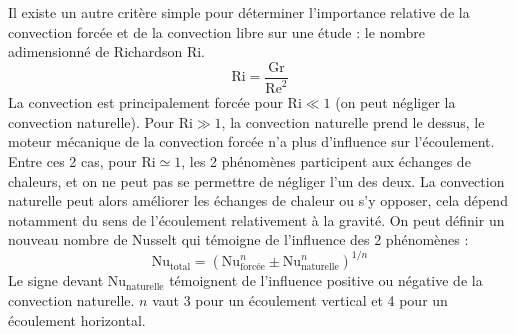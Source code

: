 Il existe un autre critère simple pour déterminer l'importance relative de la convection forcée et de la convection libre sur une étude : le nombre adimensionné de Richardson Ri.
%
\begin{equation}
    \mathrm{Ri} = \frac{\mathrm{Gr}}{\mathrm{Re}^2}
\end{equation}
%
La convection est principalement forcée pour $\mathrm{Ri} \ll 1$ (on peut négliger la convection naturelle). Pour $\mathrm{Ri} \gg 1$, la convection naturelle prend le dessus, le moteur mécanique de la convection forcée n'a plus d'influence sur l'écoulement. Entre ces 2 cas, pour $\mathrm{Ri} \simeq 1$, les 2 phénomènes participent aux échanges de chaleurs, et on ne peut pas se permettre de négliger l'un des deux. La convection naturelle peut alors améliorer les échanges de chaleur ou s'y opposer, cela dépend notamment du sens de l'écoulement relativement à la gravité. On peut définir un nouveau nombre de Nusselt qui témoigne de l'influence des 2 phénomènes :
%
\begin{equation}
    \mathrm{Nu}_{\text{total}} = \left( \mathrm{Nu}_{\text{forcée}}^n \pm \mathrm{Nu}_{\text{naturelle}}^n \right)^{1/n}
\end{equation}
%
Le signe devant $\mathrm{Nu}_{\text{naturelle}}$ témoignent de l'influence positive ou négative de la convection naturelle. $n$ vaut 3 pour un écoulement vertical et 4 pour un écoulement horizontal.
